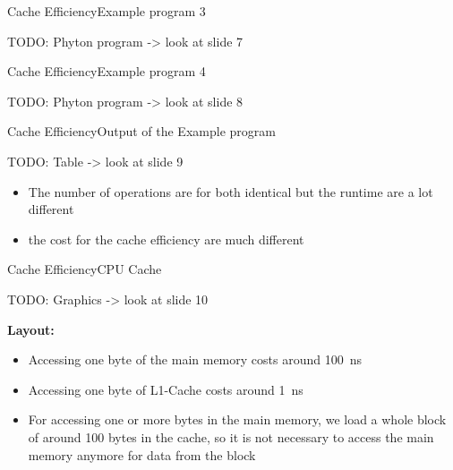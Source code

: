 \begin{frame}{Cache Efficiency}{Example program 3}

TODO: Phyton program -> look at slide 7 \vspace{2em}

\end{frame}


\begin{frame}{Cache Efficiency}{Example program 4}

TODO: Phyton program -> look at slide 8 \vspace{2em}

\end{frame}


\begin{frame}{Cache Efficiency}{Output of the Example program}

TODO: Table -> look at slide 9 \vspace{2em}

	\begin{itemize}
		\item
			The number of operations are for both identical but the runtime are a lot 
			different
		\item
			the cost for the cache efficiency are much different
	\end{itemize}
\end{frame}


\begin{frame}{Cache Efficiency}{CPU Cache}
	
	TODO: Graphics -> look at slide 10 \vspace{2em}
	
	\textbf{Layout:}
	\begin{itemize}
		\item
			Accessing one byte of the main memory costs around \SI{100}{\nano \second}
		\item
			Accessing one byte of L1-Cache costs around \SI{1}{\nano \second}
		\item
			For accessing one or more bytes in the main memory, we load a whole block 
			of around 100 bytes in the cache, so it is not necessary to access the 
			main memory anymore for data from the block
	\end{itemize}
\end{frame}


